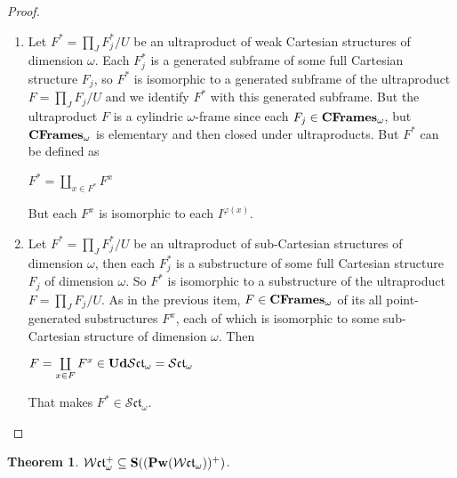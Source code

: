 \documentclass{article}
\theoremstyle{defin}
\theoremstyle{theorem}
\newtheorem{theorem}{Theorem}
\theoremstyle{claim}
\theoremstyle{prop}
\theoremstyle{lemma}
\theoremstyle{fact}
\theoremstyle{remark}
\theoremstyle{ex}
\theoremstyle{col}
\theoremstyle{question}
\begin{document}
\begin{proof}
$ $
\begin{enumerate}
\item Let $F^* = \prod \limits_{J} F^*_j / U$ be an ultraproduct of weak Cartesian structures of dimension $\omega$. Each $F^*_j$ is a generated subframe of some full Cartesian structure $F_j$, so $F^*$ is isomorphic to a generated subframe of the ultraproduct $F = \prod \limits_{J} F_j / U$ and we identify $F^*$ with this generated subframe. But the ultraproduct $F$ is a cylindric $\omega$-frame since each $F_j \in {\bf CFrames}_{\omega}$, but  ${\bf CFrames}_{\omega}$ is elementary and then closed under ultraproducts. But $F^*$ can be defined as
\begin{center}
$F^* = \coprod \limits_{x \in F^*} F^x$
\end{center}
But each $F^x$ is isomorphic to each $I^{\varphi(x)}$.
\item Let $F^* = \prod \limits_{J} F^*_j / U$ be an ultraproduct of sub-Cartesian structures of dimension $\omega$, then each $F^*_j$ is a substructure of some full Cartesian structure $F_j$ of dimension $\omega$. So $F^*$ is isomorphic to a substructure of the ultraproduct $F = \prod \limits_{J} F_j / U$. As in the previous item, $F \in {\bf CFrames}_{\omega}$ of its all point-generated substructures $F^x$, each of which is isomorphic to some sub-Cartesian structure of dimension $\omega$. Then
\begin{center}
$F = \coprod \limits_{x \in F} F^{x} \in {\bf Ud}\mathcal{S}\mathfrak{ct}_{\omega} = \mathcal{S}\mathfrak{ct}_{\omega}$
\end{center}
That makes $F^* \in \mathcal{S}\mathfrak{ct}_{\omega}$.
\end{enumerate}
\end{proof}

\begin{theorem} \label{cmfact}
$\mathcal{W}\mathfrak{ct}_{\omega}^{+} \subseteq {\bf S} (({\bf Pw}(\mathcal{W}\mathfrak{ct}_{\omega}))^{+})$.
\end{theorem}
\end{document}
